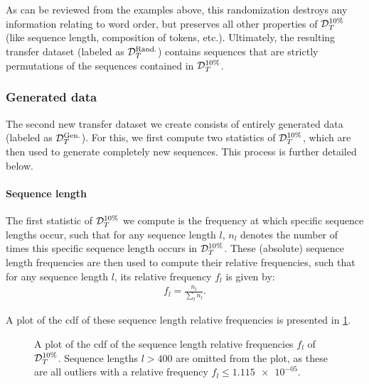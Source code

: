As can be reviewed from the examples above, this randomization destroys any information relating to word order, but preserves all other properties of $\mathcal{D}_T^{10\%}$ (like sequence length, composition of tokens, etc.). Ultimately, the resulting transfer dataset (labeled as $\mathcal{D}_T^{\text{Rand.}}$) contains sequences that are strictly permutations of the sequences contained in $\mathcal{D}_T^{10\%}$.

\subsubsection{Generated data}
The second new transfer dataset we create consists of entirely generated data (labeled as $\mathcal{D}_T^{\text{Gen.}}$). For this, we first compute two statistics of $\mathcal{D}_T^{10\%}$, which are then used to generate completely new sequences. This process is further detailed below.

\paragraph{Sequence length}
The first statistic of $\mathcal{D}_T^{10\%}$ we compute is the frequency at which specific sequence lengths occur, such that for any sequence length $l$, $n_l$ denotes the number of times this specific sequence length occurs in $\mathcal{D}_T^{10\%}$. These (absolute) sequence length frequencies are then used to compute their relative frequencies, such that for any sequence length $l$, its relative frequency $f_l$ is given by:
\begin{align*}
    f_l = \frac{n_l}{\sum_l n_l}.
\end{align*}

A plot of the \gls{cdf} of these sequence length relative frequencies is presented in \cref{fig:sequence_length_cdf_plot}.

\begin{figure}[ht!]
    \begin{center}
        
    \end{center}
    \caption[Plot of CDF of sequence length relative frequencies]{A plot of the \gls{cdf} of the sequence length relative frequencies $f_l$ of $\mathcal{D}_T^{10\%}$. Sequence lengths $l > 400$ are omitted from the plot, as these are all outliers with a relative frequency $f_l \leq \num{1.115e-05}$.}
    \label{fig:sequence_length_cdf_plot}
\end{figure}



